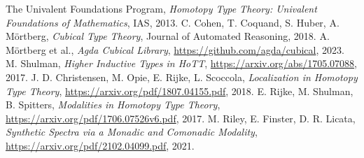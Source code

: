 \documentclass{article}
\theoremstyle{definition}
\begin{document}
\newpage

\begin{thebibliography}{9}
The Univalent Foundations Program, \emph{Homotopy Type Theory: Univalent Foundations of Mathematics}, IAS, 2013.
C. Cohen, T. Coquand, S. Huber, A. Mörtberg, \emph{Cubical Type Theory}, Journal of Automated Reasoning, 2018.
A. Mörtberg et al., \emph{Agda Cubical Library}, \url{https://github.com/agda/cubical}, 2023.
M. Shulman, \emph{Higher Inductive Types in HoTT}, \url{https://arxiv.org/abs/1705.07088}, 2017.
J. D. Christensen, M. Opie, E. Rijke, L. Scoccola, \emph{Localization in Homotopy Type Theory}, \url{https://arxiv.org/pdf/1807.04155.pdf}, 2018.
E. Rijke, M. Shulman, B. Spitters, \emph{Modalities in Homotopy Type Theory}, \url{https://arxiv.org/pdf/1706.07526v6.pdf}, 2017.
M. Riley, E. Finster, D. R. Licata, \emph{Synthetic Spectra via a Monadic and Comonadic Modality}, \url{https://arxiv.org/pdf/2102.04099.pdf}, 2021.
\end{thebibliography}
\end{document}
